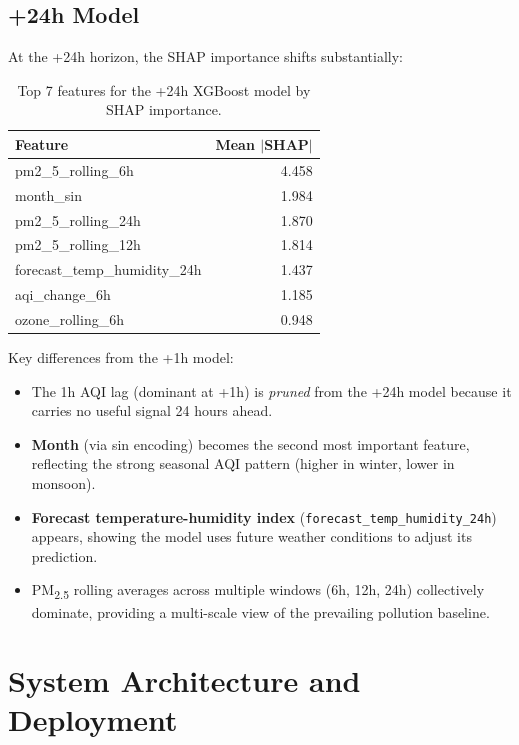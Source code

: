 \documentclass[12pt, a4paper]{article}
\begin{document}
\subsection{+24h Model}

At the +24h horizon, the SHAP importance shifts substantially:

\begin{table}[H]
\centering
\caption{Top 7 features for the +24h XGBoost model by SHAP importance.}
\begin{tabular}{lr}
\toprule
\textbf{Feature} & \textbf{Mean $|$SHAP$|$} \\
\midrule
pm2\_5\_rolling\_6h           & 4.458 \\
month\_sin                    & 1.984 \\
pm2\_5\_rolling\_24h          & 1.870 \\
pm2\_5\_rolling\_12h          & 1.814 \\
forecast\_temp\_humidity\_24h & 1.437 \\
aqi\_change\_6h               & 1.185 \\
ozone\_rolling\_6h            & 0.948 \\
\bottomrule
\end{tabular}
\end{table}

Key differences from the +1h model:
\begin{itemize}
  \item The 1h AQI lag (dominant at +1h) is \emph{pruned} from the +24h model because it carries no useful signal 24 hours ahead.
  \item \textbf{Month} (via sin encoding) becomes the second most important feature, reflecting the strong seasonal AQI pattern (higher in winter, lower in monsoon).
  \item \textbf{Forecast temperature-humidity index} (\texttt{forecast\_temp\_humidity\_24h}) appears, showing the model uses future weather conditions to adjust its prediction.
  \item PM\textsubscript{2.5} rolling averages across multiple windows (6h, 12h, 24h) collectively dominate, providing a multi-scale view of the prevailing pollution baseline.
\end{itemize}


\section{System Architecture and Deployment}
\end{document}
